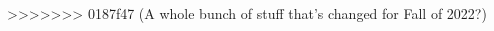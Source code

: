 \documentclass{../../oss-apphys-exam}
\begin{document}
\begin{multicols*}{2}
\begin{questions}
\begin{choices}
\begin{choices}
%      
%
%    
>>>>>>> 0187f47 (A whole bunch of stuff that's changed for Fall of 2022?)



\end{choices}
\end{choices}
\end{questions}
\end{multicols*}
\end{document}
